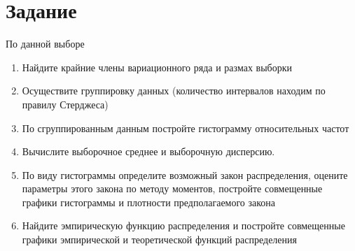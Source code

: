 \documentclass[a4paper, 14pt]{extarticle}
\begin{document}
\graphicspath{ {../latexDependencies/images} } 


\fontsize{14pt}{16pt}\selectfont

\graphicspath{ {../latexDependencies/images/LW1} }


\linespread{1.5}

\section*{Задание}

По данной выборе

\begin{enumerate}
    \item Найдите крайние члены вариационного ряда и размах выборки
    \item Осуществите группировку данных (количество интервалов 
    находим по правилу Стерджеса) 
    \item По сгруппированным данным постройте гистограмму 
    относительных частот
    \item Вычислите выборочное среднее и выборочную дисперсию.
    \item По виду гистограммы определите возможный закон распределения, 
    оцените параметры этого закона по методу моментов, постройте совмещенные 
    графики гистограммы и плотности предполагаемого закона
    \item Найдите эмпирическую функцию распределения и постройте совмещенные 
    графики эмпирической и теоретической функций распределения
\end{enumerate}
\end{document}
